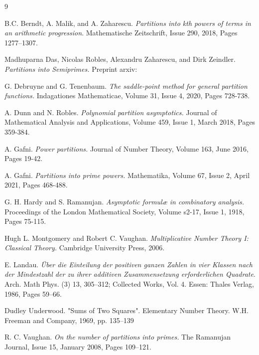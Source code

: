 \documentclass[12pt,reqno]{amsart}
\begin{document}
\begin{thebibliography}{9}

B.C. Berndt, A. Malik, and  A. Zaharescu. \textit{Partitions into kth powers of terms in an arithmetic progression}. Mathematische Zeitschrift, Issue 290, 2018, Pages 1277–1307.


Madhuparna Das, Nicolas Robles, Alexandru Zaharescu, and Dirk Zeindler. \textit{Partitions into Semiprimes.} Preprint arxiv:

G. Debruyne and G. Tenenbaum. 
\textit{The saddle-point method for general partition functions.}
Indagationes Mathematicae,
Volume 31, Issue 4,
2020,
Pages 728-738.

A. Dunn and N. Robles. \textit{Polynomial partition asymptotics.} Journal of Mathematical Analysis and Applications, Volume 459, Issue 1, March 2018, Pages 359-384.

A. Gafni. \textit{Power partitions.} Journal of Number Theory,
Volume 163, June 2016, Pages 19-42.

A. Gafni. \textit{Partitions into prime powers.} Mathematika, Volume 67, Issue 2, April 2021, Pages 468-488.

G. H. Hardy and S. Ramanujan. \textit{Asymptotic formulæ in combinatory analysis.} Proceedings of the London Mathematical Society, Volume s2-17, Issue 1, 1918, Pages 75-115.

Hugh L. Montgomery and Robert C. Vaughan. \textit{Multiplicative Number Theory I: Classical Theory.} 
Cambridge University Press, 2006. %


E. Landau. \textit{\"Uber die Einteilung der positiven ganzen Zahlen in vier Klassen nach der
Mindestzahl der zu ihrer additiven Zusammensetzung erforderlichen Quadrate}.
Arch. Math Phys. (3) 13, 305–312; Collected Works, Vol. 4. Essen: Thales Verlag,
1986, Pages 59–66.

Dudley Underwood. "Sums of Two Squares". Elementary Number Theory. W.H. Freeman and Company, 1969, pp. 135–139


R. C. Vaughan. \textit{On the number of partitions into primes.} The Ramanujan Journal, Issue 15, January 2008, Pages 109–121.


\end{thebibliography}
\end{document}
